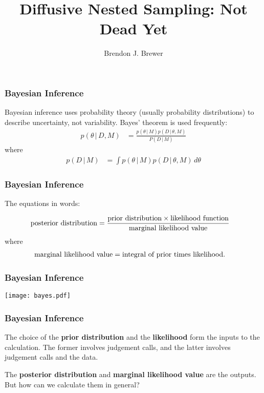 \documentclass{beamer}
\author{Brendon J. Brewer}
\title{Diffusive Nested Sampling: Not Dead Yet}
\institute{Department of Statistics, The University of Auckland}
\date{}
\newcommand{\given}{\,|\,}
\begin{document}
\frame{\titlepage}

\begin{frame}
\frametitle{Bayesian Inference}
Bayesian inference uses probability theory (usually probability distributions)
to describe uncertainty, not variability. Bayes' theorem is used frequently:
\pause
\begin{align}
p(\theta \given D, M) &= \frac{p(\theta \given M)p(D \given \theta, M)}{P(D \given M)}
\end{align}
\pause
where
\begin{align}
p(D \given M) &= \int p(\theta \given M)p(D \given \theta, M) \, d\theta
\end{align}


\end{frame}



\begin{frame}
\frametitle{Bayesian Inference}
The equations in words:

\begin{align}
\textnormal{posterior distribution} &= 
    \frac{\textnormal{prior distribution} \times \textnormal{likelihood function}}{\textnormal{marginal likelihood value}}
\end{align}
\pause
where
\begin{align}
\textnormal{marginal likelihood value} &= \textnormal{integral of prior times likelihood}.
\end{align}


\end{frame}

\begin{frame}
\frametitle{Bayesian Inference}

\begin{center}
\texttt{[image: bayes.pdf]}
\end{center}


\end{frame}


\begin{frame}
\frametitle{Bayesian Inference}
The choice of the {\bf prior distribution} and the {\bf likelihood} form the
inputs to the calculation. The former involves judgement calls, and the latter
involves judgement calls and the data.\\[0.5em]\pause

The {\bf posterior distribution} and
{\bf marginal likelihood value} are the outputs. But how can we calculate them
in general?

\end{frame}
\end{document}
